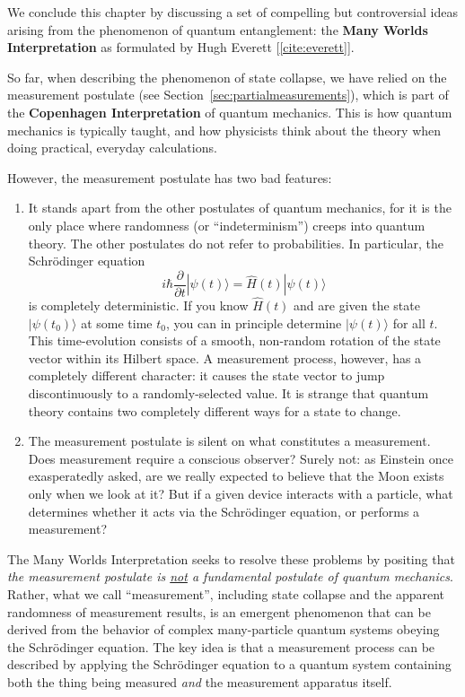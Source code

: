 \documentclass[pra,12pt]{revtex4-2}
\begin{document}
We conclude this chapter by discussing a set of compelling but
controversial ideas arising from the phenomenon of quantum
entanglement: the \textbf{Many Worlds Interpretation} as formulated by
Hugh Everett [\ref{cite:everett}].

So far, when describing the phenomenon of state collapse, we have
relied on the measurement postulate (see
Section~\ref{sec:partialmeasurements}), which is part of the
\textbf{Copenhagen Interpretation} of quantum mechanics.  This is how
quantum mechanics is typically taught, and how physicists think about
the theory when doing practical, everyday calculations.

However, the measurement postulate has two bad features:

\begin{enumerate}
\item It stands apart from the other postulates of quantum mechanics,
  for it is the only place where randomness (or ``indeterminism'')
  creeps into quantum theory.  The other postulates do not refer to
  probabilities.  In particular, the Schr\"odinger equation
\begin{equation}
  i\hbar\frac{\partial}{\partial t}|\psi(t)\rangle = \hat{H}(t) |\psi(t)\rangle
\end{equation}
is completely deterministic.  If you know $\hat{H}(t)$ and are given
the state $|\psi(t_0)\rangle$ at some time $t_0$, you can in principle
determine $|\psi(t)\rangle$ for all $t$.  This time-evolution consists
of a smooth, non-random rotation of the state vector within its
Hilbert space.  A measurement process, however, has a completely
different character: it causes the state vector to jump
discontinuously to a randomly-selected value.  It is strange that
quantum theory contains two completely different ways for a state to
change.

\item The measurement postulate is silent on what constitutes a
measurement.  Does measurement require a conscious observer?  Surely
not: as Einstein once exasperatedly asked, are we really expected to
believe that the Moon exists only when we look at it?  But if a given
device interacts with a particle, what determines whether it acts via
the Schr\"odinger equation, or performs a measurement?
\end{enumerate}

The Many Worlds Interpretation seeks to resolve these problems by
positing that \textit{the measurement postulate is \underline{not} a
  fundamental postulate of quantum mechanics}.  Rather, what we call
``measurement'', including state collapse and the apparent randomness
of measurement results, is an emergent phenomenon that can be derived
from the behavior of complex many-particle quantum systems obeying the
Schr\"odinger equation.  The key idea is that a measurement process
can be described by applying the Schr\"odinger equation to a quantum
system containing both the thing being measured \textit{and} the
measurement apparatus itself.
\end{document}
